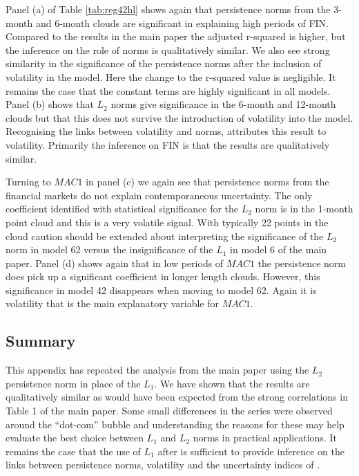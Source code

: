 \documentclass{article}
\begin{document}
Panel (a) of Table \ref{tab:reg42hl} shows again that persistence norms from the 3-month and 6-month clouds are significant in explaining high periods of FIN. Compared to the results in the main paper the adjusted r-squared is higher, but the inference on the role of norms is qualitatively similar. We also see strong similarity in the significance of the persistence norms after the inclusion of volatility in the model. Here the change to the r-squared value is negligible. It remains the case that the constant terms are highly significant in all models. Panel (b) shows that $L_2$ norms give significance in the 6-month and 12-month clouds but that this does not survive the introduction of volatility into the model. Recognising the links between volatility and norms, attributes this result to volatility. Primarily the inference on FIN is that the results are qualitatively similar.

Turning to $MAC1$ in panel (c) we again see that persistence norms from the financial markets do not explain contemporaneous uncertainty. The only coefficient identified with statistical significance for the $L_2$ norm is in the 1-month point cloud and this is a very volatile signal. With typically 22 points in the cloud caution should be extended about interpreting the significance of the $L_2$ norm in model 62 versus the insignificance of the $L_1$ in model 6 of the main paper. Panel (d) shows again that in low periods of $MAC1$ the persistence norm does pick up a significant coefficient in longer length clouds. However, this significance in model 42 disappears when moving to model 62. Again it is volatility that is the main explanatory variable for $MAC1$. 

\subsection{Summary}

This appendix has repeated the analysis from the main paper using the $L_2$ persistence norm in place of the $L_1$. We have shown that the results are qualitatively similar as would have been expected from the strong correlations in Table 1 of the main paper. Some small differences in the series were observed around the ``dot-com'' bubble and understanding the reasons for these may help evaluate the best choice between $L_1$ and $L_2$ norms in practical applications. It remains the case that the use of $L_1$ after \cite{gidea2018topological} is sufficient to provide inference on the links between persistence norms, volatility and the uncertainty indices of \cite{jurado2015measuring}.
\end{document}
